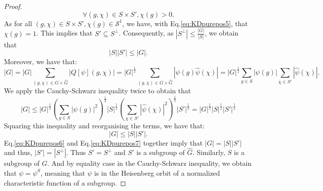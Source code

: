 \documentclass[10pt,a4paper]{amsart}
\newcommand{\card}[1]{\left|#1\right|}
\newcommand{\mcl}[1]{\ensuremath{\mathcal{#1}}}
\begin{document}
\begin{proof}
\begin{equation}
        \forall (g,\chi) \in S\times S', \chi(g) > 0.
    \end{equation}
    As for all $(g,\chi) \in S\times S', \chi(g)\in\mcl{S}^{1}$, we have, with Eq.\eqref{eq:KDpurepos5}, that $ \chi(g)=1$. This implies that $S'\subseteq S^{\perp}$. Consequently, as $\left|S^{\perp}\right| \leqslant  \frac{\left|G\right|}{\left|S\right|}$, we obtain that 
    \begin{equation}\label{eq:KDpurepos6}
        \card{S}\card{S'} \leqslant \card{G}.
    \end{equation}
    Moreover, we have that:
    \begin{equation}
             \card{G}=\card{G}\sum_{(g,\chi)\in G\times\hat{G}} \left|Q[\psi](g,\chi)\right| = \card{G}^{\frac{1}{2}}\sum_{(g,\chi)\in G\times\hat{G}} \left|\psi(g)\hat{\psi}(\chi)\right| = \card{G}^{\frac{1}{2}}\sum_{g\in S} \left|\psi(g)\right| \sum_{\chi\in S'}\left|\hat{\psi}(\chi)\right|.
    \end{equation}
    We apply the Cauchy-Schwarz inequality twice to obtain that
    \begin{equation}
        \card{G}\leqslant \card{G}^{\frac{1}{2}}\left(\sum_{g\in S} \left|\psi(g)\right|^2\right)^{\frac{1}{2}}\card{S}^{\frac{1}{2}}\left(\sum_{\chi\in S'}\left|\hat{\psi}(\chi)\right|^2\right)^{\frac{1}{2}}\card{S'}^{\frac{1}{2}} = \card{G}^{\frac{1}{2}}\card{S}^{\frac{1}{2}}\card{S'}^{\frac{1}{2}} 
    \end{equation}
    Squaring this inequality and reorganising the terms, we have that:
    \begin{equation}\label{eq:KDpurepos7}
        \card{G} \leqslant \card{S}\card{S'}.
    \end{equation}
    Eq.\eqref{eq:KDpurepos6} and Eq.\eqref{eq:KDpurepos7} together imply that $\card{G} = \card{S}\card{S'}$ and thus, $\card{S'} = \card{S^{\perp}}$. Thus $S'=S^{\perp}$ and $S'$ is a subgroup of $\hat{G}$. Similarly, $S$ is a subgroup of $G$. And by equality case in the Cauchy-Schwarz inequality, we obtain that $\psi = \psi^{S}$, meaning that $\psi$ is in the Heisenberg orbit of a normalized characteristic function of a subgroup.  
\end{proof}
\end{document}
